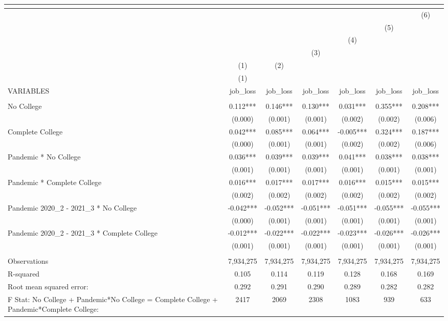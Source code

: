 \begin{tabular}{lcccccc}
\multicolumn{7}{c}{} \\ \hline
 &  &  &  &  &  & (6) \\
 &  &  &  &  & (5) &  \\
 &  &  &  & (4) &  &  \\
 &  &  & (3) &  &  &  \\
 & (1) & (2) &  &  &  &  \\
 & (1) &  &  &  &  &  \\
VARIABLES & job\_loss & job\_loss & job\_loss & job\_loss & job\_loss & job\_loss \\ \hline
 &  &  &  &  &  &  \\
No College & 0.112*** & 0.146*** & 0.130*** & 0.031*** & 0.355*** & 0.208*** \\
 & (0.000) & (0.001) & (0.001) & (0.002) & (0.002) & (0.006) \\
Complete College & 0.042*** & 0.085*** & 0.064*** & -0.005*** & 0.324*** & 0.187*** \\
 & (0.000) & (0.001) & (0.001) & (0.002) & (0.002) & (0.006) \\
Pandemic * No College & 0.036*** & 0.039*** & 0.039*** & 0.041*** & 0.038*** & 0.038*** \\
 & (0.001) & (0.001) & (0.001) & (0.001) & (0.001) & (0.001) \\
Pandemic * Complete College & 0.016*** & 0.017*** & 0.017*** & 0.016*** & 0.015*** & 0.015*** \\
 & (0.002) & (0.002) & (0.002) & (0.002) & (0.002) & (0.002) \\
Pandemic 2020\_2 - 2021\_3 * No College & -0.042*** & -0.052*** & -0.051*** & -0.051*** & -0.055*** & -0.055*** \\
 & (0.000) & (0.001) & (0.001) & (0.001) & (0.001) & (0.001) \\
Pandemic 2020\_2 - 2021\_3 * Complete College & -0.012*** & -0.022*** & -0.022*** & -0.023*** & -0.026*** & -0.026*** \\
 & (0.001) & (0.001) & (0.001) & (0.001) & (0.001) & (0.001) \\
 &  &  &  &  &  &  \\
Observations & 7,934,275 & 7,934,275 & 7,934,275 & 7,934,275 & 7,934,275 & 7,934,275 \\
R-squared & 0.105 & 0.114 & 0.119 & 0.128 & 0.168 & 0.169 \\
Root mean squared error: & 0.292 & 0.291 & 0.290 & 0.289 & 0.282 & 0.282 \\
F Stat: No College + Pandemic*No College = Complete College + Pandemic*Complete College: & 2417 & 2069 & 2308 & 1083 & 939 & 633 \\

\end{tabular}
